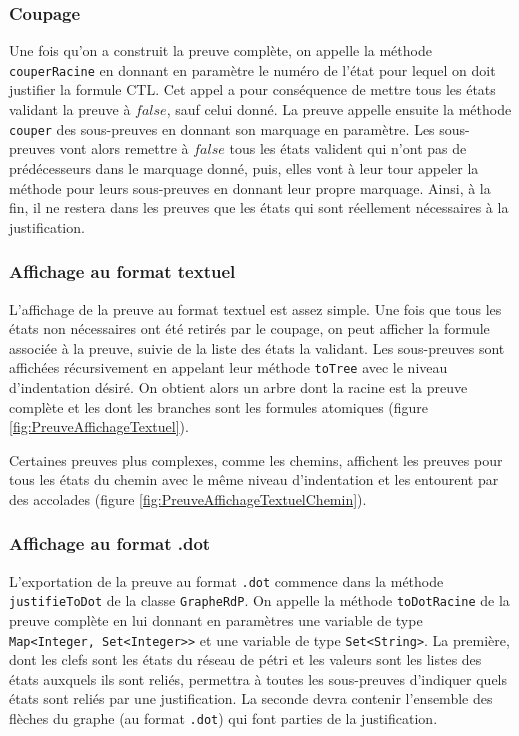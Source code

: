 \documentclass[dvipsnames]{report}
\begin{document}
\subsubsection{Coupage}

Une fois qu'on a construit la preuve complète, on appelle la méthode \texttt{couperRacine} en donnant en paramètre le numéro de l'état pour lequel on doit justifier la formule CTL. Cet appel a pour conséquence de mettre tous les états validant la preuve à $false$, sauf celui donné. La preuve appelle ensuite la méthode \texttt{couper} des sous-preuves en donnant son marquage en paramètre. Les sous-preuves vont alors remettre à $false$ tous les états valident qui n'ont pas de prédécesseurs dans le marquage donné, puis, elles vont à leur tour appeler la méthode pour leurs sous-preuves en donnant leur propre marquage. Ainsi, à la fin, il ne restera dans les preuves que les états qui sont réellement nécessaires à la justification.

\subsubsection{Affichage au format textuel}

L'affichage de la preuve au format textuel est assez simple. Une fois que tous les états non nécessaires ont été retirés par le coupage, on peut afficher la formule associée à la preuve, suivie de la liste des états la validant. Les sous-preuves sont affichées récursivement en appelant leur méthode \texttt{toTree} avec le niveau d'indentation désiré. On obtient alors un arbre dont la racine est la preuve complète et les dont les branches sont les formules atomiques (figure \ref{fig:PreuveAffichageTextuel}).



Certaines preuves plus complexes, comme les chemins, affichent les preuves pour tous les états du chemin avec le même niveau d'indentation et les entourent par des accolades (figure \ref{fig:PreuveAffichageTextuelChemin}).



\subsubsection{Affichage au format .dot}

L'exportation de la preuve au format \texttt{.dot} commence dans la méthode \texttt{justifieToDot} de la classe \texttt{GrapheRdP}. On appelle la méthode \texttt{toDotRacine} de la preuve complète en lui donnant en paramètres une variable de type \texttt{Map<Integer, {Set<Integer>}>} et une variable de type \texttt{Set<String>}. La première, dont les clefs sont les états du réseau de pétri et les valeurs sont les listes des états auxquels ils sont reliés, permettra à toutes les sous-preuves d'indiquer quels états sont reliés par une justification. La seconde devra contenir l'ensemble des flèches du graphe (au format \texttt{.dot}) qui font parties de la justification.
\end{document}
